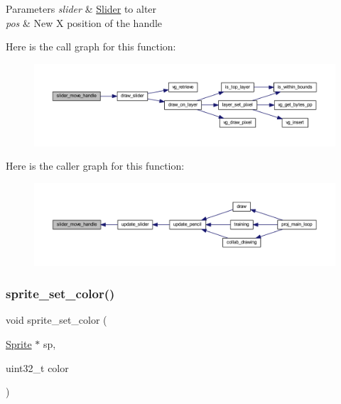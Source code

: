 \begin{DoxyParams}{Parameters}
{\em slider} & \mbox{\hyperlink{struct_slider}{Slider}} to alter \\
\hline
{\em pos} & New X position of the handle \\
\hline
\end{DoxyParams}
Here is the call graph for this function\+:\nopagebreak
\begin{figure}[H]
\begin{center}
\leavevmode
\includegraphics[width=350pt]{group__sprite_ga3f6696185609cd55e3535258deb30ea7_cgraph}
\end{center}
\end{figure}
Here is the caller graph for this function\+:\nopagebreak
\begin{figure}[H]
\begin{center}
\leavevmode
\includegraphics[width=350pt]{group__sprite_ga3f6696185609cd55e3535258deb30ea7_icgraph}
\end{center}
\end{figure}
\mbox{\label{group__sprite_ga9b18b2f3de6d4ee00e344881a08b17d6}} 
\subsubsection{\texorpdfstring{sprite\+\_\+set\+\_\+color()}{sprite\_set\_color()}}
{\footnotesize\ttfamily void sprite\+\_\+set\+\_\+color (\begin{DoxyParamCaption}\item[{\mbox{\hyperlink{struct_sprite}{Sprite}} $\ast$}]{sp,  }\item[{uint32\+\_\+t}]{color }\end{DoxyParamCaption})}



